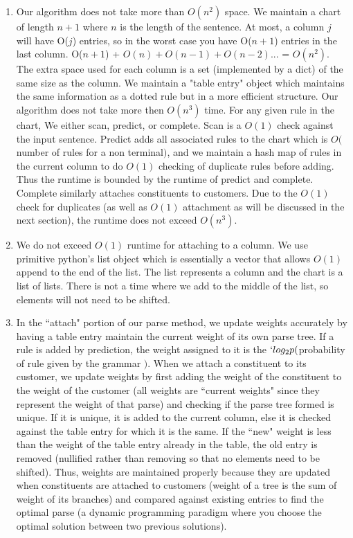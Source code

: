 \documentclass[12pt,a4paper]{article}
\begin{document}
\begin{enumerate}
\begin{enumerate}[label=(\alph*)]
\item Our algorithm does not take more than $O(n^2)$ space. We maintain a chart of length $n+1$ where $n$ is the length of the sentence. At most, a column $j$ will have O($j$) entries, so in the worst case you have O($n+1$) entries in the last column. O($n+1$) + $O(n) + O(n-1) + O(n-2)$... = $O(n^2)$. The extra space used for each column is a set (implemented by a dict) of the same size as the column. We maintain a "table entry" object which maintains the same information as a dotted rule but in a more efficient structure. Our algorithm does not take more then $O(n^3)$ time. For any given rule in the chart, We either scan, predict, or complete. Scan is a $O(1)$ check against the input sentence. Predict adds all associated rules to the chart which is $O($number of rules for a non terminal$)$, and we maintain a hash map of rules in the current column to do $O(1)$ checking of duplicate rules before adding. Thus the runtime is bounded by the runtime of predict and complete. Complete similarly attaches constituents to customers. Due to the $O(1)$ check for duplicates (as well as $O(1)$ attachment as will be discussed in the next section), the runtime does not exceed $O(n^3)$.\\
\item We do not exceed $O(1)$ runtime for attaching to a column. We use primitive python's list object which is essentially a vector that allows $O(1)$ append to the end of the list. The list represents a column and the chart is a list of lists. There is not a time where we add to the middle of the list, so elements will not need to be shifted. \\
\item In the ``attach" portion of our parse method, we update weights accurately by having a table entry maintain the current weight of its own parse tree. If a rule is added by prediction, the weight assigned to it is the $`log_2 {p(}$probability of rule given by the grammar $)$. When we attach a constituent to its customer, we update weights by first adding the weight of the constituent to the weight of the customer (all weights are ``current weights" since they represent the weight of that parse) and checking if the parse tree formed is unique. If it is unique, it is added to the current column, else it is checked against the table entry for which it is the same. If the ``new" weight is less than the weight of the table entry already in the table, the old entry is removed (nullified rather than removing so that no elements need to be shifted). Thus, weights are maintained properly because they are updated when constituents are attached to customers (weight of a tree is the sum of weight of its branches) and compared against existing entries to find the optimal parse (a dynamic programming paradigm where you choose the optimal solution between two previous solutions). \\

\end{enumerate}
\end{enumerate}
\end{document}
